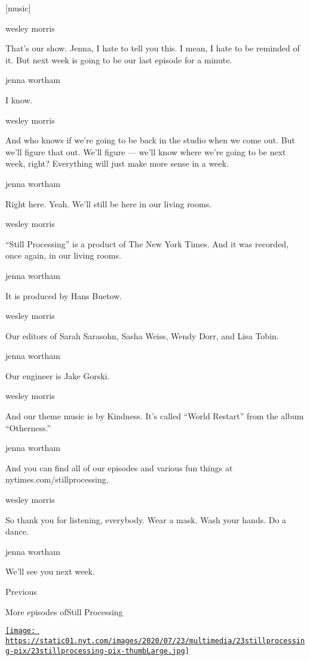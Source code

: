 {[}music{]}

wesley morris

That's our show. Jenna, I hate to tell you this. I mean, I hate to be
reminded of it. But next week is going to be our last episode for a
minute.

jenna wortham

I know.

wesley morris

And who knows if we're going to be back in the studio when we come out.
But we'll figure that out. We'll figure --- we'll know where we're going
to be next week, right? Everything will just make more sense in a week.

jenna wortham

Right here. Yeah. We'll still be here in our living rooms.

wesley morris

``Still Processing'' is a product of The New York Times. And it was
recorded, once again, in our living rooms.

jenna wortham

It is produced by Hans Buetow.

wesley morris

Our editors of Sarah Sarasohn, Sasha Weiss, Wendy Dorr, and Lisa Tobin.

jenna wortham

Our engineer is Jake Gorski.

wesley morris

And our theme music is by Kindness. It's called ``World Restart'' from
the album ``Otherness.''

jenna wortham

And you can find all of our episodes and various fun things at
nytimes.com/stillprocessing.

wesley morris

So thank you for listening, everybody. Wear a mask. Wash your hands. Do
a dance.

jenna wortham

We'll see you next week.

Previous

More episodes ofStill Processing

\href{https://www.nytimes.com/2020/07/23/podcasts/hamilton-ziwe-discomfort.html?action=click\&module=audio-series-bar\&region=header\&pgtype=Article}{\texttt{[image: https://static01.nyt.com/images/2020/07/23/multimedia/23stillprocessing-pix/23stillprocessing-pix-thumbLarge.jpg]}}

